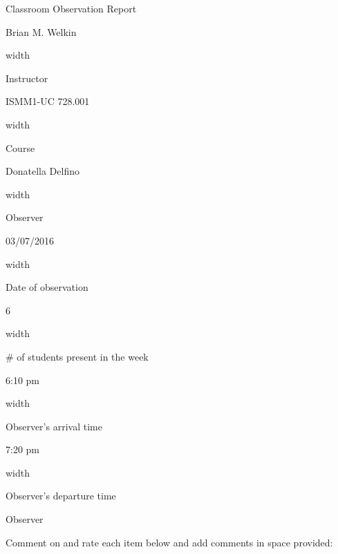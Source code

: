 \documentclass[11pt,dvipsnames]{article}
\newcommand*{\linesep}[1]{%
	\par\nobreak
	\vskip 3pt \leaders\vrule width #1\vskip 0.81pt
	\nobreak
}
\begin{document}
	\begin{center}
		{\Large Classroom Observation Report}
	\end{center}
\begin{minipage}{0.35\textwidth}
		Brian M. Welkin \par
		\linesep{\textwidth}
		Instructor
	\end{minipage}
\hspace{0.2\textwidth}
	\begin{minipage}{0.35\textwidth}
			ISMM1-UC 728.001 \par
			\linesep{\textwidth}
			Course
		\end{minipage}
		
\vskip 1cm
		
\begin{minipage}{0.35\textwidth}
	Donatella Delfino \par
	\linesep{\textwidth}
	Observer
\end{minipage}
\hspace{0.2\textwidth}
\begin{minipage}{0.35\textwidth}
	03/07/2016 \par
	\linesep{\textwidth}
	Date of observation
\end{minipage}

\vskip 1cm

\begin{minipage}{0.35\textwidth}
	6 \par
	\linesep{\textwidth}
	\# of students present in the week
\end{minipage}

\vskip 1cm

\begin{minipage}{0.35\textwidth}
	6:10 pm \par
	\linesep{\textwidth}
	Observer's arrival time
\end{minipage}
\hspace{0.2\textwidth}
\begin{minipage}{0.35\textwidth}
	7:20 pm \par
	\linesep{\textwidth}
	Observer's departure time
\end{minipage}

\vskip 1cm
{\large Observer}

Comment on and rate each item below and add comments in space provided:
\vskip 0.5cm

		
\end{document}
